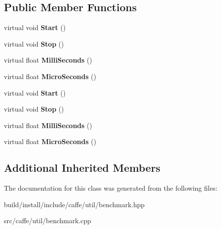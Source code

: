 \subsection*{Public Member Functions}
\begin{DoxyCompactItemize}
\item 
\mbox{\label{classcaffe_1_1_c_p_u_timer_ad7d3835101e57b25373389d45b000233}} 
virtual void {\bfseries Start} ()
\item 
\mbox{\label{classcaffe_1_1_c_p_u_timer_a44b519b603c185b0d625d229065d07b0}} 
virtual void {\bfseries Stop} ()
\item 
\mbox{\label{classcaffe_1_1_c_p_u_timer_a08572d87bd635c3e7bdeee2b264640e5}} 
virtual float {\bfseries Milli\+Seconds} ()
\item 
\mbox{\label{classcaffe_1_1_c_p_u_timer_a1830b20c7d04afaf8cbbd3569b54c3ee}} 
virtual float {\bfseries Micro\+Seconds} ()
\item 
\mbox{\label{classcaffe_1_1_c_p_u_timer_a08d27374177046162ffac7d946ffb339}} 
virtual void {\bfseries Start} ()
\item 
\mbox{\label{classcaffe_1_1_c_p_u_timer_a8d5c4045c96c3ff48b63f6771291bb03}} 
virtual void {\bfseries Stop} ()
\item 
\mbox{\label{classcaffe_1_1_c_p_u_timer_acae59bd93ac5f4c4116481061261293e}} 
virtual float {\bfseries Milli\+Seconds} ()
\item 
\mbox{\label{classcaffe_1_1_c_p_u_timer_ac5f246950070fcccd12d6e144f52eb04}} 
virtual float {\bfseries Micro\+Seconds} ()
\end{DoxyCompactItemize}
\subsection*{Additional Inherited Members}


The documentation for this class was generated from the following files\+:\begin{DoxyCompactItemize}
\item 
build/install/include/caffe/util/benchmark.\+hpp\item 
src/caffe/util/benchmark.\+cpp\end{DoxyCompactItemize}

